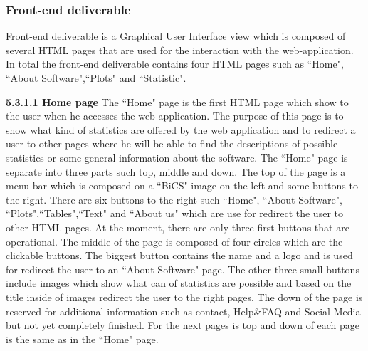 \documentclass[conference,compsoc]{IEEEtran}
\begin{document}
\subsubsection{Front-end deliverable}
Front-end deliverable is a Graphical User Interface view which is composed of several HTML pages that are used for the interaction with the web-application. In total the front-end deliverable contains four HTML pages such as ``Home", ``About Software",``Plots" and ``Statistic". 

\noindent
\newline\newline
\textbf{5.3.1.1 Home page}
\newline\newline
The ``Home" page is the first HTML page which show to the user when he accesses the web application. The purpose of this page is to show what kind of statistics are offered by the web application and to redirect a user to other pages where he will be able to find the descriptions of possible statistics or some general information about the software.                                                                                   
\newline
The ``Home" page is separate into three parts such top, middle and down. The top of the page is a menu bar which is composed on a ``BiCS" image on the left and some buttons to the right. There are six buttons to the right such ``Home", ``About Software", ``Plots",``Tables",``Text" and ``About us" which are use for redirect the user to other HTML pages. At the moment, there are only three first buttons that are operational.                                                                                                                                                \newline
The middle of the page is composed of four circles which are the clickable buttons. The biggest button contains the name and a logo and is used for redirect the user to an ``About Software" page. The other three small buttons include images which show what can of statistics are possible and based on the title inside of images redirect the user to the right pages.                                                                   
The down of the page is reserved for additional information such as contact, Help\&FAQ and Social Media but not yet completely finished.  
\newline      
For the next pages is top and down of each page is the same as in the ``Home" page.                                                   
     
\end{document}
